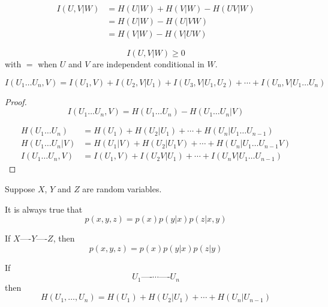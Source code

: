 \begin{definition}
    \[
        \begin{aligned}
            I(U,V \vert W) &= H(U\vert W) + H(V\vert W) - H(UV \vert W)\\
             &= H(U \vert W) - H(U \vert V W)\\
             &= H(V \vert W) - H(V \vert U W)
        \end{aligned}
    \]
\end{definition}

\begin{theorem}
    \[
        I(U,V \vert W) \geqslant 0
    \]
    with $=$ when $U$ and $V$ are independent conditional in $W$.
\end{theorem}

\begin{theorem}
    \[
        I(U_1\ldots U_n,V) = I(U_1,V) + I(U_2,V\vert U_1    ) + I(U_3,V\vert U_1, U_2) + \cdots + I(U_n, V \vert U_1\ldots U_n)
    \]
\end{theorem}
\begin{proof}
    \[
        I(U_1\ldots U_n, V) = H(U_1\ldots U_n) - H(U_1\ldots U_n \vert V)    
    \]
    
    \[
        \begin{aligned}
            H(U_1\ldots U_n) &= H(U_1) + H(U_2\vert U_1) + \cdots + H(U_n \vert U_1 \ldots U_{n-1})\\
            H(U_1\ldots U_n \vert V) &= H(U_1 \vert V) + H(U_2\vert U_1 V) + \cdots + H(U_n \vert U_1 \ldots U_{n-1} V)\\
            I(U_1\ldots U_n, V) &= I(U_1,V) + I(U_2 V \vert U_1) + \cdots + I(U_n V \vert U_1 \ldots U_{n-1})
        \end{aligned}
    \]
\end{proof}

\begin{remark}
    Suppose $X$, $Y$ and $Z$ are random variables.
    
    It is always true that
    \[
        p(x,y,z) = p(x)p(y\vert x) p(z\vert x,y)
    \]
    
    If $X \text{----} Y \text{----} Z$, then
    \[
        p(x,y,z) = p(x)p(y\vert x) p(z\vert y)
    \]
\end{remark}

\begin{proposition}
    If
    \[
        U_1 \text{----} \cdots \text{----} U_n    
    \]
    then
    \[
    H(U_1, \ldots, U_n) = H(U_1) + H(U_2 \vert U_1) + \cdots + H(U_n \vert U_{n-1})
    \]    
\end{proposition}

